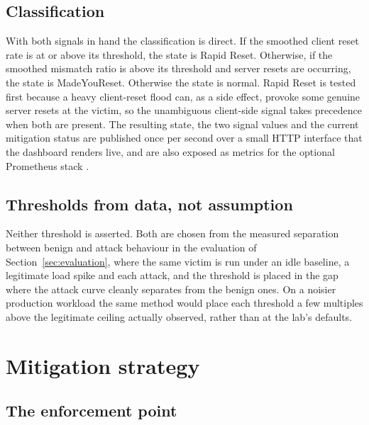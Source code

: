 \documentclass[a4paper,fleqn]{cas-dc}
\begin{document}
\subsection{Classification}\label{sec:classification}

With both signals in hand the classification is direct. If the smoothed client reset rate is at or above its threshold, the state is Rapid Reset. Otherwise, if the smoothed mismatch ratio is above its threshold and server resets are occurring, the state is MadeYouReset. Otherwise the state is normal. Rapid Reset is tested first because a heavy client-reset flood can, as a side effect, provoke some genuine server resets at the victim, so the unambiguous client-side signal takes precedence when both are present. The resulting state, the two signal values and the current mitigation status are published once per second over a small HTTP interface that the dashboard renders live, and are also exposed as metrics for the optional Prometheus stack \cite{prometheus}.

\subsection{Thresholds from data, not assumption}\label{sec:thresholds}

Neither threshold is asserted. Both are chosen from the measured separation between benign and attack behaviour in the evaluation of Section~\ref{sec:evaluation}, where the same victim is run under an idle baseline, a legitimate load spike and each attack, and the threshold is placed in the gap where the attack curve cleanly separates from the benign ones. On a noisier production workload the same method would place each threshold a few multiples above the legitimate ceiling actually observed, rather than at the lab's defaults.

\section{Mitigation strategy}\label{sec:mitigation}

\subsection{The enforcement point}\label{sec:guard}
\end{document}
